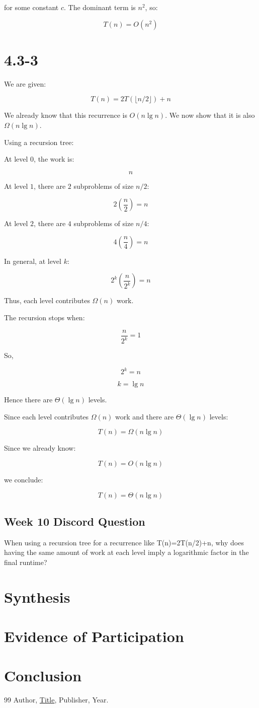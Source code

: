 \documentclass{article}
\theoremstyle{theorem}
\theoremstyle{definition}
\theoremstyle{remark}
\begin{document}
for some constant $c$. The dominant term is $n^2$, so:

\[
T(n)=O(n^2)
\]

\section*{4.3-3}

We are given:

\[
T(n)=2T(\lfloor n/2 \rfloor)+n
\]

We already know that this recurrence is $O(n\lg n)$. We now show that it is also $\Omega(n\lg n)$.

Using a recursion tree:

At level $0$, the work is:

\[
n
\]

At level $1$, there are $2$ subproblems of size $n/2$:

\[
2\left(\frac{n}{2}\right)=n
\]

At level $2$, there are $4$ subproblems of size $n/4$:

\[
4\left(\frac{n}{4}\right)=n
\]

In general, at level $k$:

\[
2^k\left(\frac{n}{2^k}\right)=n
\]

Thus, each level contributes $\Omega(n)$ work.

The recursion stops when:

\[
\frac{n}{2^k}=1
\]

So,

\[
2^k=n
\]

\[
k=\lg n
\]

Hence there are $\Theta(\lg n)$ levels.

Since each level contributes $\Omega(n)$ work and there are $\Theta(\lg n)$ levels:

\[
T(n)=\Omega(n\lg n)
\]

Since we already know:

\[
T(n)=O(n\lg n)
\]

we conclude:

\[
T(n)=\Theta(n\lg n)
\]

\subsection*{Week 10 Discord Question}
When using a recursion tree for a recurrence like T(n)=2T(n/2)+n, why does having the same amount of work at each level imply a logarithmic factor in the final runtime?

\section{Synthesis}

\section{Evidence of Participation}

\section{Conclusion}\label{conclusion}

\begin{thebibliography}{99}
 Author, \href{https://en.wikipedia.org/wiki/LaTeX}{Title}, Publisher, Year.
\end{thebibliography}
\end{document}

